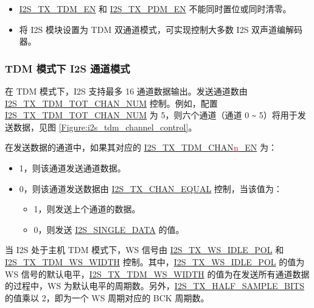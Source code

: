 \documentclass[main\_\_CN.tex]{subfiles}
\begin{document}
\begin{tiplisting}
\vspace{-2em}
\begin{itemize}
    \item \hyperref[fielddesc:I2STXTDMEN]{I2S\_TX\_TDM\_EN} 和 \hyperref[fielddesc:I2STXPDMEN]{I2S\_TX\_PDM\_EN} 不能同时置位或同时清零。
    \item 将 I2S 模块设置为 TDM 双通道模式，可实现控制大多数 I2S 双声道编解码器。
    \end{itemize}
\end{tiplisting}

\subsubsection{TDM 模式下 I2S 通道模式} \label{sec:tdm-channel-mode}
在 TDM 模式下，I2S 支持最多 16 通道数据输出。发送通道数由 \hyperref[fielddesc:I2STXTDMTOTCHANNUM]{I2S\_TX\_TDM\_TOT\_CHAN\_NUM} 控制。例如，配置 \hyperref[fielddesc:I2STXTDMTOTCHANNUM]{I2S\_TX\_TDM\_TOT\_CHAN\_NUM} 为 5，则六个通道（通道 0 \verb+~+ 5）将用于发送数据，见图
\ref{Figure:i2s_tdm_channel_control}。

在发送数据的通道中，如果其对应的 \hyperref[fielddesc:I2STXTDMCHAN0EN]{I2S\_TX\_TDM\_CHAN{\textcolor{red}{n}}\_EN} 为：
\begin{itemize}
    \item 1，则该通道发送通道数据。
    \item 0，则该通道发送数据由 \hyperref[fielddesc:I2STXCHANEQUAL]{I2S\_TX\_CHAN\_EQUAL} 控制，当该值为：
    \begin{itemize}
        \item 1，则发送上个通道的数据。
        \item 0，则发送 \hyperref[fielddesc:I2SSINGLEDATA]{I2S\_SINGLE\_DATA} 的值。
    \end{itemize}
\end{itemize}
当 I2S 处于主机 TDM 模式下，WS 信号由 \hyperref[fielddesc:I2STXWSIDLEPOL]{I2S\_TX\_WS\_IDLE\_POL} 和 \hyperref[fielddesc:I2STXTDMWSWIDTH]{I2S\_TX\_TDM\_WS\_WIDTH} 控制。其中，\hyperref[fielddesc:I2STXWSIDLEPOL]{I2S\_TX\_WS\_IDLE\_POL} 的值为 WS 信号的默认电平，\hyperref[fielddesc:I2STXTDMWSWIDTH]{I2S\_TX\_TDM\_WS\_WIDTH} 的值为在发送所有通道数据的过程中，WS 为默认电平的周期数。另外，\hyperref[fielddesc:I2STXHALFSAMPLEBITS]{I2S\_TX\_HALF\_SAMPLE\_BITS} 的值乘以 2，即为一个 WS 周期对应的 BCK 周期数。
\end{document}
